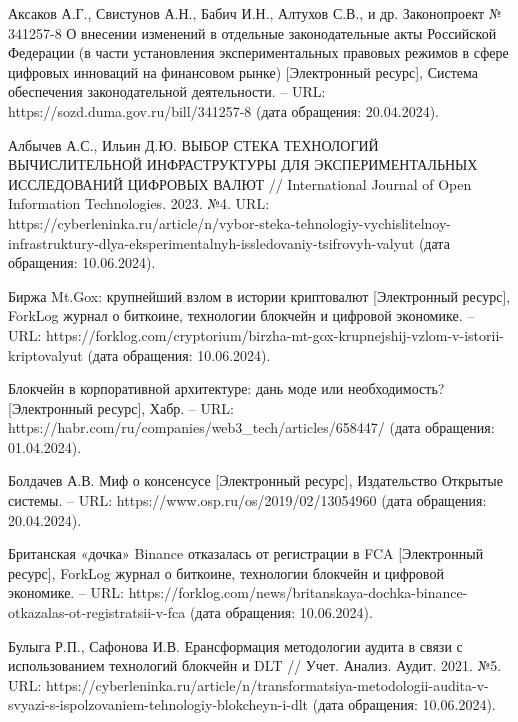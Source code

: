 \begin{thebibliography}{00}


 Аксаков А.Г., Свистунов А.Н., Бабич И.Н., Алтухов С.В., и др. Законопроект № 341257-8 О внесении изменений в отдельные законодательные акты Российской Федерации (в части установления экспериментальных правовых режимов в сфере цифровых инноваций на финансовом рынке) [Электронный ресурс], Система обеспечения законодательной деятельности. -- URL: https://sozd.duma.gov.ru/bill/341257-8 (дата обращения: 20.04.2024).

 Албычев А.С., Ильин Д.Ю. ВЫБОР СТЕКА ТЕХНОЛОГИЙ ВЫЧИСЛИТЕЛЬНОЙ ИНФРАСТРУКТУРЫ ДЛЯ ЭКСПЕРИМЕНТАЛЬНЫХ ИССЛЕДОВАНИЙ ЦИФРОВЫХ ВАЛЮТ // International Journal of Open Information Technologies. 2023. №4. URL: https://cyberleninka.ru/article/n/vybor-steka-tehnologiy-vychislitelnoy-infrastruktury-dlya-eksperimentalnyh-issledovaniy-tsifrovyh-valyut (дата обращения: 10.06.2024).

 Биржа Mt.Gox: крупнейший взлом в истории криптовалют [Электронный ресурс], ForkLog журнал о биткоине, технологии блокчейн и цифровой экономике. -- URL: https://forklog.com/cryptorium/birzha-mt-gox-krupnejshij-vzlom-v-istorii-kriptovalyut (дата обращения: 10.06.2024).

 Блокчейн в корпоративной архитектуре: дань моде или необходимость? [Электронный ресурс], Хабр. -- URL:  https://habr.com/ru/companies/web3\_tech/articles/658447/ (дата обращения: 01.04.2024).

 Болдачев А.В. Миф о консенсусе [Электронный ресурс], Издательство Открытые системы. -- URL:  https://www.osp.ru/os/2019/02/13054960 (дата обращения: 20.04.2024).

 Британская «дочка» Binance отказалась от регистрации в FCA [Электронный ресурс], ForkLog журнал о биткоине, технологии блокчейн и цифровой экономике. -- URL: https://forklog.com/news/britanskaya-dochka-binance-otkazalas-ot-registratsii-v-fca (дата обращения: 10.06.2024).

 Булыга Р.П., Сафонова И.В. Ерансформация методологии аудита в связи с использованием технологий блокчейн и DLT // Учет. Анализ. Аудит. 2021. №5. URL: https://cyberleninka.ru/article/n/transformatsiya-metodologii-audita-v-svyazi-s-ispolzovaniem-tehnologiy-blokcheyn-i-dlt (дата обращения: 10.06.2024).


\end{thebibliography}
